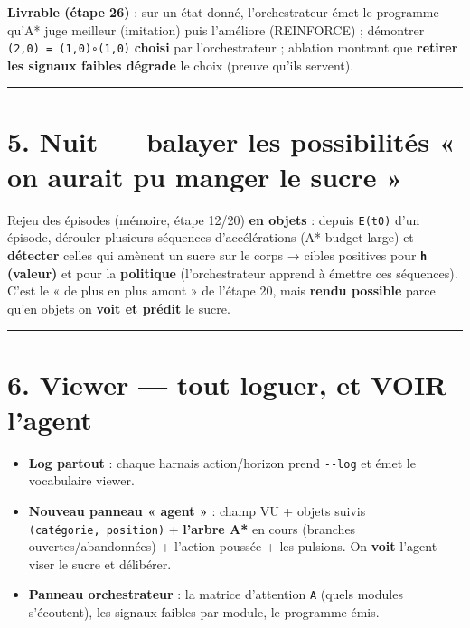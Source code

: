 \documentclass[
  french,
  11pt,
]{article}
\providecommand{\tightlist}{%
  \setlength{\itemsep}{0pt}\setlength{\parskip}{0pt}}
\begin{document}
\textbf{Livrable (étape 26)} : sur un état donné, l'orchestrateur émet
le programme qu'A* juge meilleur (imitation) puis l'améliore (REINFORCE)
; démontrer \texttt{(2,0)\ =\ (1,0)∘(1,0)} \textbf{choisi} par
l'orchestrateur ; ablation montrant que \textbf{retirer les signaux
faibles dégrade} le choix (preuve qu'ils servent).

\begin{center}\rule{0.5\linewidth}{0.5pt}\end{center}

\section{5. Nuit --- balayer les possibilités « on aurait pu manger le
sucre
»}\label{nuit-balayer-les-possibilituxe9s-on-aurait-pu-manger-le-sucre}

Rejeu des épisodes (mémoire, étape 12/20) \textbf{en objets} : depuis
\texttt{E(t0)} d'un épisode, dérouler plusieurs séquences
d'accélérations (A* budget large) et \textbf{détecter} celles qui
amènent un sucre sur le corps → cibles positives pour \textbf{\texttt{h}
(valeur)} et pour la \textbf{politique} (l'orchestrateur apprend à
émettre ces séquences). C'est le « de plus en plus amont » de l'étape
20, mais \textbf{rendu possible} parce qu'en objets on \textbf{voit et
prédit} le sucre.

\begin{center}\rule{0.5\linewidth}{0.5pt}\end{center}

\section{6. Viewer --- tout loguer, et VOIR
l'agent}\label{viewer-tout-loguer-et-voir-lagent}

\begin{itemize}
\tightlist
\item
  \textbf{Log partout} : chaque harnais action/horizon prend
  \texttt{-\/-log} et émet le vocabulaire viewer.
\item
  \textbf{Nouveau panneau « agent »} : champ VU + objets suivis
  \texttt{(catégorie,\ position)} + \textbf{l'arbre A*} en cours
  (branches ouvertes/abandonnées) + l'action poussée + les pulsions. On
  \textbf{voit} l'agent viser le sucre et délibérer.
\item
  \textbf{Panneau orchestrateur} : la matrice d'attention \texttt{A}
  (quels modules s'écoutent), les signaux faibles par module, le
  programme émis.
\end{itemize}
\end{document}
